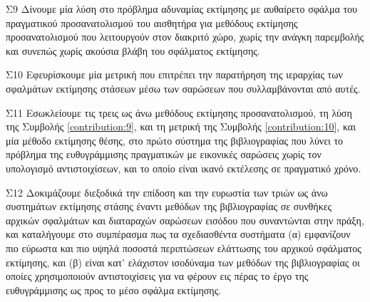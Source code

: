 \begin{bw_box}
\begin{customcontribution}{Σ9}
  \label{contribution:9}
  Δίνουμε μία λύση στο πρόβλημα αδυναμίας εκτίμησης με αυθαίρετο σφάλμα του
  πραγματικού προσανατολισμού του αισθητήρα για μεθόδους εκτίμησης
  προσανατολισμού που λειτουργούν στον διακριτό χώρο, χωρίς την ανάγκη
  παρεμβολής και συνεπώς χωρίς ακούσια βλάβη του σφάλματος εκτίμησης.
\end{customcontribution}
\end{bw_box}

\begin{bw_box}
\begin{customcontribution}{Σ10}
  \label{contribution:10}
  Εφευρίσκουμε μία μετρική που επιτρέπει την παρατήρηση της ιεραρχίας των
  σφαλμάτων εκτίμησης στάσεων μέσω των σαρώσεων που συλλαμβάνονται από αυτές.
\end{customcontribution}
\end{bw_box}

\begin{bw_box}
\begin{customcontribution}{Σ11}
  \label{contribution:11}
  Εσωκλείουμε τις τρεις ως άνω μεθόδους εκτίμησης προσανατολισμού, τη λύση της
  Συμβολής \ref{contribution:9}, και τη μετρική της Συμβολής
  \ref{contribution:10}, και μία μέθοδο εκτίμησης θέσης, στο πρώτο σύστημα της
  βιβλιογραφίας που λύνει το πρόβλημα της ευθυγράμμισης πραγματικών με
  εικονικές σαρώσεις χωρίς τον υπολογισμό αντιστοιχίσεων, και το οποίο είναι
  ικανό εκτέλεσης σε πραγματικό χρόνο.
\end{customcontribution}
\end{bw_box}

\begin{bw_box}
\begin{customcontribution}{Σ12}
  \label{contribution:12}
  Δοκιμάζουμε διεξοδικά την επίδοση και την ευρωστία των τριών ως άνω
  συστημάτων εκτίμησης στάσης έναντι μεθόδων της βιβλιογραφίας σε συνθήκες
  αρχικών σφαλμάτων και διαταραχών σαρώσεων εισόδου που συναντώνται στην πράξη,
  και καταλήγουμε στο συμπέρασμα πως τα σχεδιασθέντα συστήματα (α) εμφανίζουν
  πιο εύρωστα και πιο υψηλά ποσοστά περιπτώσεων ελάττωσης του αρχικού σφάλματος
  εκτίμησης, και (β) είναι κατ' ελάχιστον ισοδύναμα των μεθόδων της
  βιβλιογραφίας οι οποίες χρησιμοποιούν αντιστοιχίσεις για να φέρουν εις πέρας
  το έργο της ευθυγράμμισης ως προς το μέσο σφάλμα εκτίμησης.
\end{customcontribution}
\end{bw_box}
\vspace{1cm}



